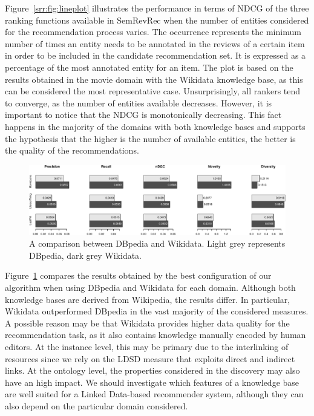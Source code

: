Figure~\ref{srr:fig:lineplot} illustrates the performance in terms of NDCG of the three ranking functions available in SemRevRec when the number of entities considered for the recommendation process varies. The occurrence represents the minimum number of times an entity needs to be annotated in the reviews of a certain item in order to be included in the candidate recommendation set. It is expressed as a percentage of the most annotated entity for an item. The plot is based on the results obtained in the movie domain with the Wikidata knowledge base, as this can be considered the most representative case. Unsurprisingly, all rankers tend to converge, as the number of entities available decreases. However, it is important to notice that the NDCG is monotonically decreasing. This fact happens in the majority of the domains with both knowledge bases and supports the hypothesis that the higher is the number of available entities, the better is the quality of the recommendations.

\begin{figure}
\centering
\includegraphics[width=\textwidth]{barplot}
\caption[Comparison between DBpedia and Wikidata]{A comparison between DBpedia and Wikidata. Light grey represents DBpedia, dark grey Wikidata.}
\label{srr:fig:barplot}
\end{figure}

Figure~\ref{srr:fig:barplot} compares the results obtained by the best configuration of our algorithm when using DBpedia and Wikidata for each domain. Although both knowledge bases are derived from Wikipedia, the results differ. In particular, Wikidata outperformed DBpedia in the vast majority of the considered measures. A possible reason may be that Wikidata provides higher data quality for the recommendation task, as it also contains knowledge manually encoded by human editors. At the instance level, this may be primary due to the interlinking of resources since we rely on the LDSD measure that exploits direct and indirect links. At the ontology level, the properties considered in the discovery may also have an high impact. We should investigate which features of a knowledge base are well suited for a Linked Data-based recommender system, although they can also depend on the particular domain considered.

